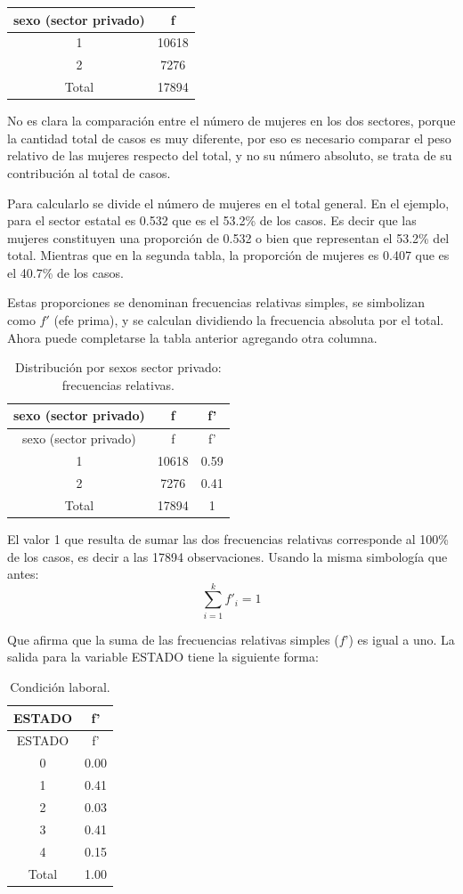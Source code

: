 \documentclass[]{book}
\begin{document}
\begin{longtable}[]{@{}cc@{}}
\toprule
sexo (sector privado) & f\tabularnewline
\midrule
\endhead
1 & 10618\tabularnewline
2 & 7276\tabularnewline
Total & 17894\tabularnewline
\bottomrule
\end{longtable}

No es clara la comparación entre el número de mujeres en los dos sectores, porque la cantidad total de casos es muy diferente, por eso es necesario comparar el peso relativo de las mujeres respecto del total, y no su número absoluto, se trata de su contribución al total de casos.

Para calcularlo se divide el número de mujeres en el total general. En el ejemplo, para el sector estatal es 0.532 que es el 53.2\% de los casos. Es decir que las mujeres constituyen una proporción de 0.532 o bien que representan el 53.2\% del total. Mientras que en la segunda tabla, la proporción de mujeres es 0.407 que es el 40.7\% de los casos.

Estas proporciones se denominan frecuencias relativas simples, se simbolizan como \(f'\) (efe prima), y se calculan dividiendo la frecuencia absoluta por el total. Ahora puede completarse la tabla anterior agregando otra columna.

\begin{longtable}[]{@{}ccc@{}}
\caption{\label{tab:unnamed-chunk-43}Distribución por sexos sector privado: frecuencias relativas.}\tabularnewline
\toprule
sexo (sector privado) & f & f'\tabularnewline
\midrule
\endfirsthead
\toprule
sexo (sector privado) & f & f'\tabularnewline
\midrule
\endhead
1 & 10618 & 0.59\tabularnewline
2 & 7276 & 0.41\tabularnewline
Total & 17894 & 1\tabularnewline
\bottomrule
\end{longtable}

El valor 1 que resulta de sumar las dos frecuencias relativas corresponde al 100\% de los casos, es decir a las 17894 observaciones. Usando la misma simbología que antes: \[\sum_{i=1}^{k} f'_i =1\]

Que afirma que la suma de las frecuencias relativas simples (\(f’\)) es igual a uno.
La salida para la variable ESTADO tiene la siguiente forma:

\begin{longtable}[]{@{}cc@{}}
\caption{\label{tab:unnamed-chunk-44}Condición laboral.}\tabularnewline
\toprule
ESTADO & f'\tabularnewline
\midrule
\endfirsthead
\toprule
ESTADO & f'\tabularnewline
\midrule
\endhead
0 & 0.00\tabularnewline
1 & 0.41\tabularnewline
2 & 0.03\tabularnewline
3 & 0.41\tabularnewline
4 & 0.15\tabularnewline
Total & 1.00\tabularnewline
\bottomrule
\end{longtable}
\end{document}
